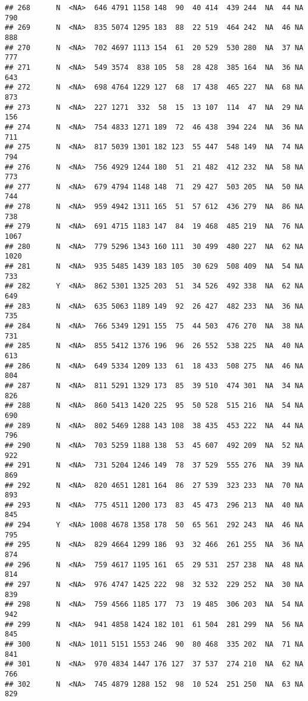 \documentclass[]{article}
\begin{document}
\begin{verbatim}
## 268      N  <NA>  646 4791 1158 148  90  40 414  439 244  NA  44 NA  790
## 269      N  <NA>  835 5074 1295 183  88  22 519  464 242  NA  46 NA  888
## 270      N  <NA>  702 4697 1113 154  61  20 529  530 280  NA  37 NA  777
## 271      N  <NA>  549 3574  838 105  58  28 428  385 164  NA  36 NA  643
## 272      N  <NA>  698 4764 1229 127  68  17 438  465 227  NA  68 NA  873
## 273      N  <NA>  227 1271  332  58  15  13 107  114  47  NA  29 NA  156
## 274      N  <NA>  754 4833 1271 189  72  46 438  394 224  NA  36 NA  711
## 275      N  <NA>  817 5039 1301 182 123  55 447  548 149  NA  74 NA  794
## 276      N  <NA>  756 4929 1244 180  51  21 482  412 232  NA  58 NA  773
## 277      N  <NA>  679 4794 1148 148  71  29 427  503 205  NA  50 NA  744
## 278      N  <NA>  959 4942 1311 165  51  57 612  436 279  NA  86 NA  738
## 279      N  <NA>  691 4715 1183 147  84  19 468  485 219  NA  76 NA 1067
## 280      N  <NA>  779 5296 1343 160 111  30 499  480 227  NA  62 NA 1020
## 281      N  <NA>  935 5485 1439 183 105  30 629  508 409  NA  54 NA  733
## 282      Y  <NA>  862 5301 1325 203  51  34 526  492 338  NA  62 NA  649
## 283      N  <NA>  635 5063 1189 149  92  26 427  482 233  NA  36 NA  735
## 284      N  <NA>  766 5349 1291 155  75  44 503  476 270  NA  38 NA  731
## 285      N  <NA>  855 5412 1376 196  96  26 552  538 225  NA  40 NA  613
## 286      N  <NA>  649 5334 1209 133  61  18 433  508 275  NA  46 NA  804
## 287      N  <NA>  811 5291 1329 173  85  39 510  474 301  NA  34 NA  826
## 288      N  <NA>  860 5413 1420 225  95  50 528  515 216  NA  54 NA  690
## 289      N  <NA>  802 5469 1288 143 108  38 435  453 222  NA  44 NA  796
## 290      N  <NA>  703 5259 1188 138  53  45 607  492 209  NA  52 NA  922
## 291      N  <NA>  731 5204 1246 149  78  37 529  555 276  NA  39 NA  869
## 292      N  <NA>  820 4651 1281 164  86  27 539  323 233  NA  70 NA  893
## 293      N  <NA>  775 4511 1200 173  83  45 473  296 213  NA  40 NA  845
## 294      Y  <NA> 1008 4678 1358 178  50  65 561  292 243  NA  46 NA  795
## 295      N  <NA>  829 4664 1299 186  93  32 466  261 255  NA  36 NA  874
## 296      N  <NA>  759 4617 1195 161  65  29 531  257 238  NA  48 NA  814
## 297      N  <NA>  976 4747 1425 222  98  32 532  229 252  NA  30 NA  839
## 298      N  <NA>  759 4566 1185 177  73  19 485  306 203  NA  54 NA  942
## 299      N  <NA>  941 4858 1424 182 101  61 504  281 299  NA  56 NA  845
## 300      N  <NA> 1011 5151 1553 246  90  80 468  335 202  NA  71 NA  841
## 301      N  <NA>  970 4834 1447 176 127  37 537  274 210  NA  62 NA  766
## 302      N  <NA>  745 4879 1288 152  98  10 524  251 250  NA  63 NA  829

\end{verbatim}
\end{document}

